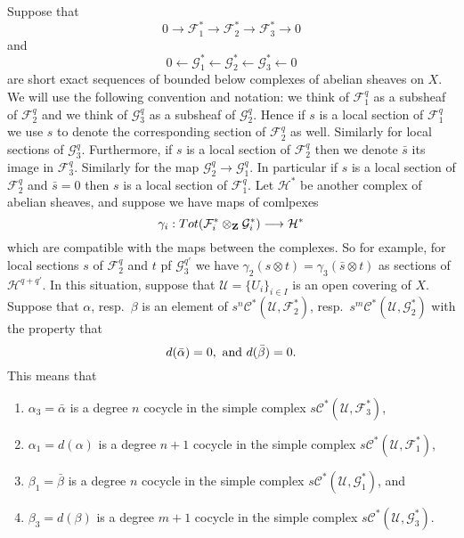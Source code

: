 \medskip\noindent
Suppose that
$$
0 
\to
{\mathcal F}_1^*
\to 
{\mathcal F}_2^*
\to 
{\mathcal F}_3^*
\to 
0
$$
and
$$
0 
\leftarrow
{\mathcal G}_1^*
\leftarrow
{\mathcal G}_2^*
\leftarrow
{\mathcal G}_3^*
\leftarrow
0
$$
are short exact sequences of bounded below complexes of abelian
sheaves on $X$. We will use the following convention and notation: we think of
${\mathcal F}_1^q$ as a subsheaf of ${\mathcal F}_2^q$ and we think of
${\mathcal G}_3^q$ as a subsheaf of ${\mathcal G}_2^q$. Hence if $s$ is
a local section of ${\mathcal F}_1^q$ we use $s$ to denote 
the corresponding section of ${\mathcal F}_2^q$ as well. Similarly 
for local sections of ${\mathcal G}_3^q$. Furthermore,
if $s$ is a local section of ${\mathcal F}_2^q$ then we denote
$\bar s$ its image in ${\mathcal F}_3^q$. Similarly for the
map ${\mathcal G}_2^q \to {\mathcal G}^q_1$. In particular if
$s$ is a local section of ${\mathcal F}_2^q$ and $\bar s = 0$
then $s$ is a local section of ${\mathcal F}_1^q$. Let ${\mathcal H}^*$
be another complex of abelian sheaves, and suppose
we have maps of comlpexes
$$
\gamma_i :
Tot({\mathcal F}_i^* \otimes_{\bf Z} {\mathcal G}_i^*)
\longrightarrow
{\mathcal H}^*
$$
which are compatible with the maps between the complexes. So for
example, for local sections $s$ of ${\mathcal F}_2^q$ and
$t$ pf ${\mathcal G}_3^{q'}$ we have $\gamma_2(s\otimes t)
= \gamma_3(\bar s \otimes t)$ as sections of ${\mathcal H}^{q+q'}$.
In this situation, suppose that ${\mathcal U} = \{ U_i \}_{i\in I}$
is an open covering of $X$. Suppose that $\alpha$, resp.\ 
$\beta$ is an element of $s^n{\mathcal C}^*({\mathcal U}, {\mathcal F}_2^*)$,
resp.\ $s^m{\mathcal C}^*({\mathcal U}, {\mathcal G}_2^*)$ with the
property that 
$$
d(\bar \alpha) = 0,\ \hbox{and}\ d(\bar \beta)=0.
$$
This means that
\begin{enumerate}
\item $\alpha_3 = \bar \alpha$ is a degree $n$ cocycle
in the simple complex $s{\mathcal C}^*({\mathcal U}, {\mathcal F}_3^*)$,
\item $\alpha_1 = d(\alpha)$ is a degree $n+1$ 
cocycle in the simple complex $s{\mathcal C}^*({\mathcal U}, {\mathcal F}_1^*)$,
\item $\beta_1 = \bar \beta$ is a degree $n$ cocycle
in the simple complex $s{\mathcal C}^*({\mathcal U}, {\mathcal G}_1^*)$, and
\item $\beta_3 = d(\beta)$ is a degree $m+1$ 
cocycle in the simple complex $s{\mathcal C}^*({\mathcal U}, {\mathcal G}_3^*)$.
\end{enumerate}


